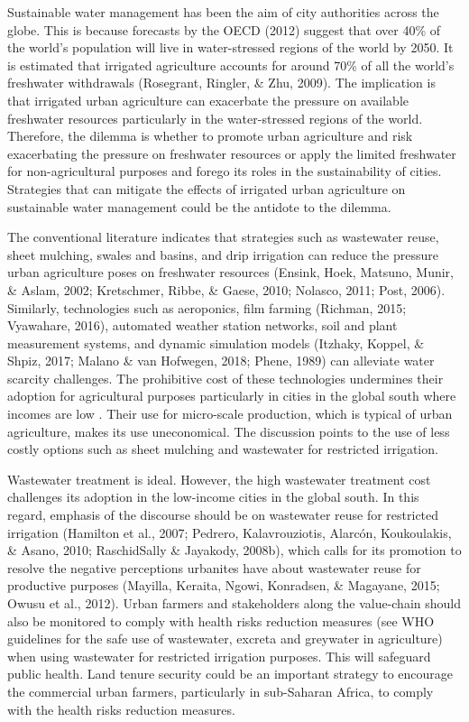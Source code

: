 Sustainable water management has been the aim of city authorities across the globe. This is because forecasts by the OECD (2012) suggest that over 40\% of the world's population will live in water-stressed regions of the world by 2050. It is estimated that irrigated agriculture accounts for around 70\% of all the world's freshwater withdrawals (Rosegrant, Ringler, \& Zhu, 2009). The implication is that irrigated urban agriculture can exacerbate the pressure on available freshwater resources particularly in the water-stressed regions of the world. Therefore, the dilemma is whether to promote urban agriculture and risk exacerbating the pressure on freshwater resources or apply the limited freshwater for non-agricultural purposes and forego its roles in the sustainability of cities. Strategies that can mitigate the effects of irrigated urban agriculture on sustainable water management could be the antidote to the dilemma.

The conventional literature indicates that strategies such as wastewater reuse, sheet mulching, swales and basins, and drip irrigation can reduce the pressure urban agriculture poses on freshwater resources (Ensink, Hoek, Matsuno, Munir, \& Aslam, 2002; Kretschmer, Ribbe, \& Gaese, 2010; Nolasco, 2011; Post, 2006). Similarly, technologies such as aeroponics, film farming \cite{Ayambire2019} (Richman, 2015; Vyawahare, 2016), automated weather station networks, soil and plant measurement systems, and dynamic simulation models (Itzhaky, Koppel, \& Shpiz, 2017; Malano \& van Hofwegen, 2018; Phene, 1989) can alleviate water scarcity challenges. The prohibitive cost of these technologies undermines their adoption for agricultural purposes particularly in cities in the global south where incomes are low \cite{Ayambire2019}. Their use for micro-scale production, which is typical of urban agriculture, makes its use uneconomical. The discussion points to the use of less costly options such as sheet mulching and wastewater for restricted irrigation.

Wastewater treatment is ideal. However, the high wastewater treatment cost challenges its adoption in the low-income cities in the global south. In this regard, emphasis of the discourse should be on wastewater reuse for restricted irrigation (Hamilton et al., 2007; Pedrero, Kalavrouziotis, Alarcón, Koukoulakis, \& Asano, 2010; RaschidSally \& Jayakody, 2008b), which calls for its promotion to resolve the negative perceptions urbanites have about wastewater reuse for productive purposes (Mayilla, Keraita, Ngowi, Konradsen, \& Magayane, 2015; Owusu et al., 2012). Urban farmers and stakeholders along the value-chain should also be monitored to comply with health risks reduction measures (see WHO guidelines for the safe use of wastewater, excreta and greywater in agriculture) when using wastewater for restricted irrigation purposes. This will safeguard public health. Land tenure security could be an important strategy to encourage the commercial urban farmers, particularly in sub-Saharan Africa, to comply with the health risks reduction measures.

